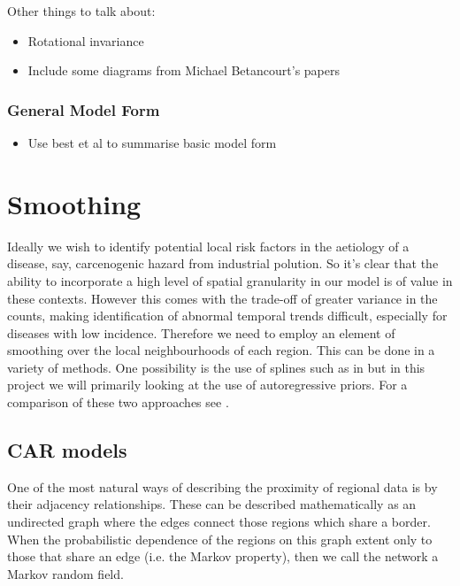 \documentclass[11pt]{report}
\begin{document}
Other things to talk about:
\begin{itemize}

\item Rotational invariance

\item Include some diagrams from Michael Betancourt's papers

\end{itemize}

\subsection{General Model Form}

\begin{itemize}
\item Use best et al to summarise basic model form
\end{itemize}

\chapter{Smoothing}

Ideally we wish to identify potential local risk factors in the aetiology of a disease, say, carcenogenic hazard from industrial polution. So it's clear that the ability to incorporate a high level of spatial granularity in our model is of value in these contexts. However this comes with the trade-off of greater variance in the counts, making identification of abnormal temporal trends difficult, especially for diseases with low incidence. Therefore we need to employ an element of smoothing over the local neighbourhoods of each region. This can be done in a variety of methods. One possibility is the use of splines such as in \citet{spline} but in this project we will primarily looking at the use of autoregressive priors. For a comparison of these two approaches see \cite{splinecompare}.   

\section{CAR models} \label{carmodel}

One of the most natural ways of describing the proximity of regional data is by their adjacency relationships. These can be described mathematically as an undirected graph where the edges connect those regions which share a border. When the probabilistic dependence of the regions on this graph extent only to those that share an edge (i.e. the Markov property), then we call the network a Markov random field. \\ 
\end{document}
